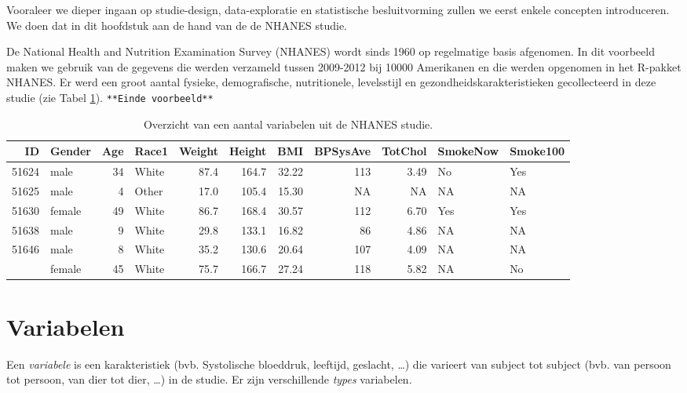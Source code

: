 \documentclass[12pt,dutch,coursenotes]{book}
\theoremstyle{definition}
\theoremstyle{definition}
\theoremstyle{definition}
\theoremstyle{remark}
\let\BeginKnitrBlock\begin \let\EndKnitrBlock\end
\begin{document}
Vooraleer we dieper ingaan op studie-design, data-exploratie en
statistische besluitvorming zullen we eerst enkele concepten
introduceren. We doen dat in dit hoofdstuk aan de hand van de de NHANES
studie.

\BeginKnitrBlock{example}[NHANES studie]
\protect\hypertarget{exm:nhanesExConcepten}{}{\label{exm:nhanesExConcepten}
\iffalse (NHANES studie) \fi{} }
\EndKnitrBlock{example}

De National Health and Nutrition Examination Survey (NHANES) wordt sinds
1960 op regelmatige basis afgenomen. In dit voorbeeld maken we gebruik
van de gegevens die werden verzameld tussen 2009-2012 bij 10000
Amerikanen en die werden opgenomen in het R-pakket NHANES. Er werd een
groot aantal fysieke, demografische, nutritionele, levelsstijl en
gezondheidskarakteristieken gecollecteerd in deze studie (zie Tabel
\ref{tab:nhanesConcepten}). \texttt{**Einde\ voorbeeld**}

\begin{table}[t]

\caption{\label{tab:nhanesConcepten}Overzicht van een aantal variabelen uit de NHANES studie.}
\centering
\begin{tabular}{rlrlrrrrrll}
\toprule
ID & Gender & Age & Race1 & Weight & Height & BMI & BPSysAve & TotChol & SmokeNow & Smoke100\\
\midrule
51624 & male & 34 & White & 87.4 & 164.7 & 32.22 & 113 & 3.49 & No & Yes\\
51625 & male & 4 & Other & 17.0 & 105.4 & 15.30 & NA & NA & NA & NA\\
51630 & female & 49 & White & 86.7 & 168.4 & 30.57 & 112 & 6.70 & Yes & Yes\\
51638 & male & 9 & White & 29.8 & 133.1 & 16.82 & 86 & 4.86 & NA & NA\\
51646 & male & 8 & White & 35.2 & 130.6 & 20.64 & 107 & 4.09 & NA & NA\\
\addlinespace
51647 & female & 45 & White & 75.7 & 166.7 & 27.24 & 118 & 5.82 & NA & No\\
\bottomrule
\end{tabular}
\end{table}

\section{Variabelen}\label{variabelen}

Een \emph{variabele} is een karakteristiek (bvb. Systolische bloeddruk,
leeftijd, geslacht, \ldots{}) die varieert van subject tot subject (bvb.
van persoon tot persoon, van dier tot dier, \ldots{}) in de studie. Er
zijn verschillende \emph{types} variabelen.
\end{document}
